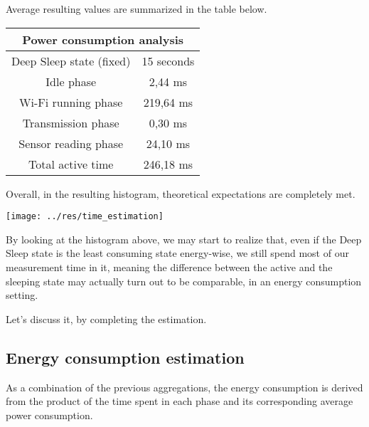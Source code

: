 \documentclass[a4paper,11pt]{article} %
\begin{document}
    Average resulting values are summarized in the table below.

    \smallskip

    \begin{center}
        \begin{tabular}{|c|c|}
            \hline
            \multicolumn{2}{|c|}{Power consumption analysis} \\
            \hline
            Deep Sleep state (fixed) & 15 seconds \\
            \hline
            Idle phase               & 2,44 ms    \\
            \hline
            Wi-Fi running phase      & 219,64 ms  \\
            \hline
            Transmission phase       & 0,30 ms    \\
            \hline
            Sensor reading phase     & 24,10 ms   \\
            \hline
            Total active time        & 246,18 ms  \\
            \hline
        \end{tabular}
    \end{center}

    \smallskip

    Overall, in the resulting histogram, theoretical expectations are completely met.

    \medskip

    \begin{center}
        \texttt{[image: ../res/time\_estimation]}
    \end{center}

    By looking at the histogram above, we may start to realize that, even if the Deep Sleep state is the least consuming state energy-wise, we still spend most of our measurement time in it, meaning the difference between the active and the sleeping state may actually turn out to be comparable, in an energy consumption setting.

    Let's discuss it, by completing the estimation.

    \subsection{Energy consumption estimation}\label{subsec:energy-consumption-estimation}

    As a combination of the previous aggregations, the energy consumption is derived from the product of the time spent in each phase and its corresponding average power consumption.
\end{document}
